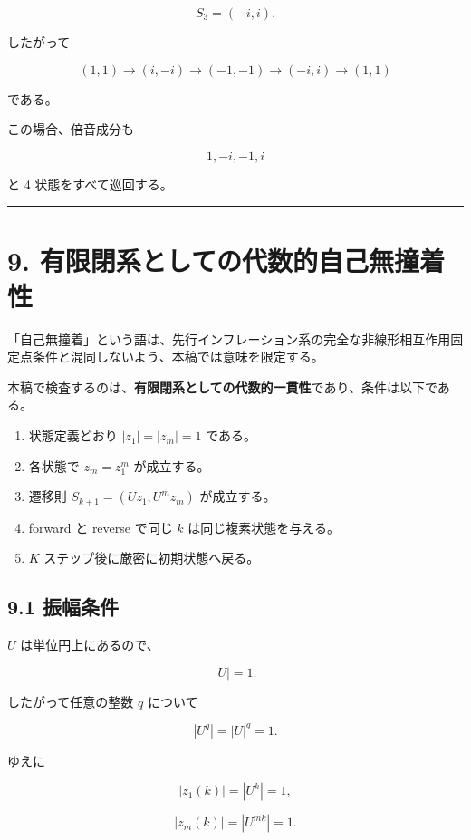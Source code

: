 \documentclass[
  a4paper,
]{ltjsarticle}
\providecommand{\tightlist}{%
  \setlength{\itemsep}{0pt}\setlength{\parskip}{0pt}}
\begin{document}
\[
S_3
=
(-i,i).
\]

したがって

\[
\boxed{
(1,1)
\to
(i,-i)
\to
(-1,-1)
\to
(-i,i)
\to
(1,1)
}
\]

である。

この場合、倍音成分も

\[
1,-i,-1,i
\]

と 4 状態をすべて巡回する。

\begin{center}\rule{0.5\linewidth}{0.5pt}\end{center}

\section{9.
有限閉系としての代数的自己無撞着性}\label{ux6709ux9650ux9589ux7cfbux3068ux3057ux3066ux306eux4ee3ux6570ux7684ux81eaux5df1ux7121ux649eux7740ux6027}

「自己無撞着」という語は、先行インフレーション系の完全な非線形相互作用固定点条件と混同しないよう、本稿では意味を限定する。

本稿で検査するのは、\textbf{有限閉系としての代数的一貫性}であり、条件は以下である。

\begin{enumerate}
\def\labelenumi{\arabic{enumi}.}
\tightlist
\item
  状態定義どおり \(|z_1|=|z_m|=1\) である。
\item
  各状態で \(z_m=z_1^m\) が成立する。
\item
  遷移則 \(S_{k+1}=(Uz_1,U^m z_m)\) が成立する。
\item
  forward と reverse で同じ \(k\) は同じ複素状態を与える。
\item
  \(K\) ステップ後に厳密に初期状態へ戻る。
\end{enumerate}

\subsection{9.1 振幅条件}\label{ux632fux5e45ux6761ux4ef6}

\(U\) は単位円上にあるので、

\[
|U|=1.
\]

したがって任意の整数 \(q\) について

\[
|U^q|
=
|U|^q
=
1.
\]

ゆえに

\[
|z_1(k)|
=
|U^k|
=
1,
\]

\[
|z_m(k)|
=
|U^{mk}|
=
1.
\]
\end{document}
